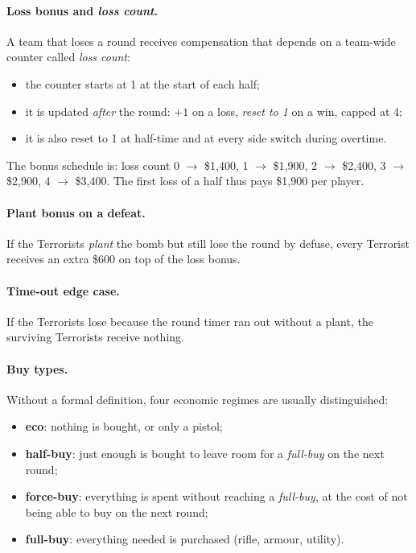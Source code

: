 \paragraph{Loss bonus and \emph{loss count}.}
A team that loses a round receives compensation that depends on a
team-wide counter called \emph{loss count}:
\begin{itemize}
  \item the counter starts at 1 at the start of each half;
  \item it is updated \emph{after} the round: $+1$ on a loss,
    \emph{reset to 1} on a win, capped at 4;
  \item it is also reset to 1 at half-time and at every side switch
    during overtime.
\end{itemize}
The bonus schedule is: loss count 0 $\to$ \$1{,}400, 1 $\to$
\$1{,}900, 2 $\to$ \$2{,}400, 3 $\to$ \$2{,}900, 4 $\to$ \$3{,}400.
The first loss of a half thus pays \$1{,}900 per player.

\paragraph{Plant bonus on a defeat.}
If the Terrorists \emph{plant} the bomb but still lose the round by
defuse, every Terrorist receives an extra \$600 on top of the loss
bonus.

\paragraph{Time-out edge case.}
If the Terrorists lose because the round timer ran out without a
plant, the surviving Terrorists receive nothing.

\paragraph{Buy types.}
Without a formal definition, four economic regimes are usually
distinguished:
\begin{itemize}
  \item \textbf{eco}: nothing is bought, or only a pistol;
  \item \textbf{half-buy}: just enough is bought to leave room for a
    \emph{full-buy} on the next round;
  \item \textbf{force-buy}: everything is spent without reaching a
    \emph{full-buy}, at the cost of not being able to buy on the
    next round;
  \item \textbf{full-buy}: everything needed is purchased (rifle,
    armour, utility).
\end{itemize}

